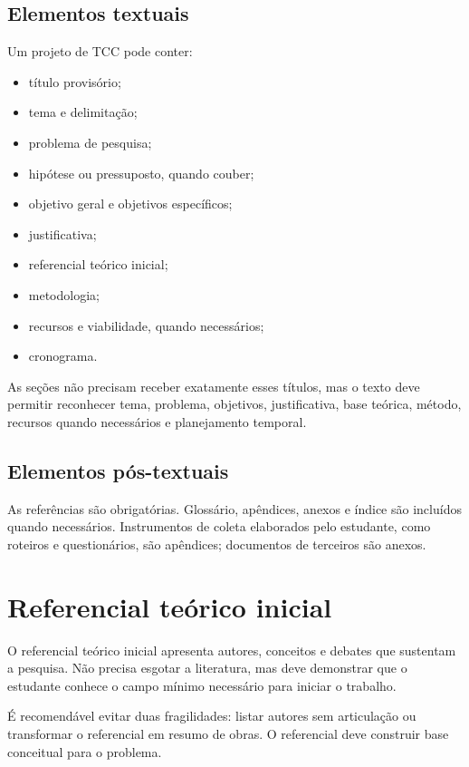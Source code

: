 \subsection{Elementos textuais}

Um projeto de TCC pode conter:

\begin{itemize}
  \item título provisório;
  \item tema e delimitação;
  \item problema de pesquisa;
  \item hipótese ou pressuposto, quando couber;
  \item objetivo geral e objetivos específicos;
  \item justificativa;
  \item referencial teórico inicial;
  \item metodologia;
  \item recursos e viabilidade, quando necessários;
  \item cronograma.
\end{itemize}

As seções não precisam receber exatamente esses títulos, mas o texto deve permitir reconhecer tema, problema, objetivos, justificativa, base teórica, método, recursos quando necessários e planejamento temporal.

\subsection{Elementos pós-textuais}

As referências são obrigatórias. Glossário, apêndices, anexos e índice são incluídos quando necessários. Instrumentos de coleta elaborados pelo estudante, como roteiros e questionários, são apêndices; documentos de terceiros são anexos.

\section{Referencial teórico inicial}

O referencial teórico inicial apresenta autores, conceitos e debates que sustentam a pesquisa. Não precisa esgotar a literatura, mas deve demonstrar que o estudante conhece o campo mínimo necessário para iniciar o trabalho.

É recomendável evitar duas fragilidades: listar autores sem articulação ou transformar o referencial em resumo de obras. O referencial deve construir base conceitual para o problema.

